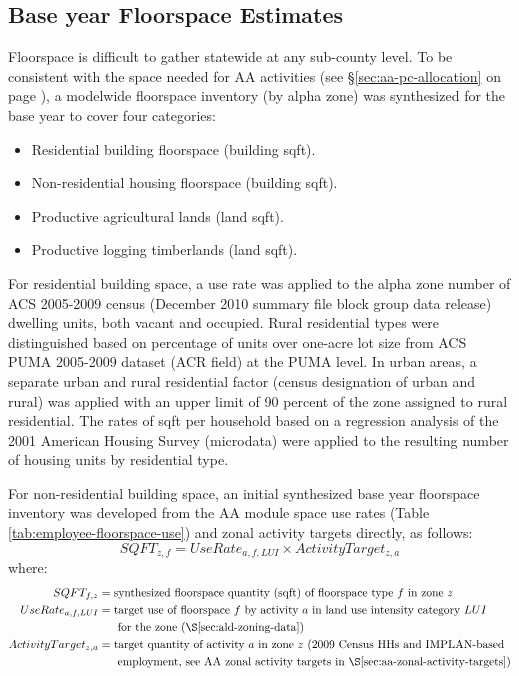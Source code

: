 \subsection{Base year Floorspace Estimates}\label{sec:ald-baseyear-floorspace}  %
Floorspace is difficult to gather statewide at any sub-county level. To be consistent with the space needed for AA activities (see \S\ref{sec:aa-pc-allocation} on page \pageref{sec:aa-pc-allocation}), a modelwide floorspace inventory (by alpha zone) was synthesized for the base year to cover four categories:
\begin{itemize}
\item Residential building floorspace (building sqft).
\item Non-residential housing floorspace (building sqft).
\item Productive agricultural lands (land sqft).
\item Productive logging timberlands (land sqft). 
\end{itemize}

For residential building space, a use rate was applied to the alpha zone number of ACS 2005-2009 census (December 2010 summary file block group data release) dwelling units, both vacant and occupied. Rural residential types were distinguished based on percentage of units over one-acre lot size from ACS PUMA 2005-2009 dataset (ACR field) at the PUMA level. In urban areas, a separate urban and rural residential factor (census designation of urban and rural) was applied with an upper limit of 90 percent of the zone assigned to rural residential. The rates of sqft per household based on a regression analysis of the 2001 American Housing Survey (microdata) were applied to the resulting number of housing units by residential type.


For non-residential building space, an initial synthesized base year floorspace inventory was developed from the AA module space use rates (Table \ref{tab:employee-floorspace-use}) and zonal activity targets directly, as follows:
\begin{equation}  %
SQFT_{z,f} = UseRate_{a,f,LUI} \times ActivityTarget_{z,a}
\end{equation}
\noindent where:
\begin{align*}
SQFT_{f,z} &= \text{synthesized floorspace quantity (sqft) of floorspace type $f$ in zone $z$} \\
UseRate_{a,f,LUI} &= \text{target use of floorspace $f$ by activity $a$ in land use intensity category $LUI$} \\
 &~~~~~\text{for the zone (\S\ref{sec:ald-zoning-data})} \\
ActivityTarget_{z,a} &= \text{target quantity of activity $a$ in zone $z$ (2009 Census HHs and IMPLAN-based} \\
 &~~~~~\text{employment, see AA zonal activity targets in \S\ref{sec:aa-zonal-activity-targets})}
\end{align*} 


